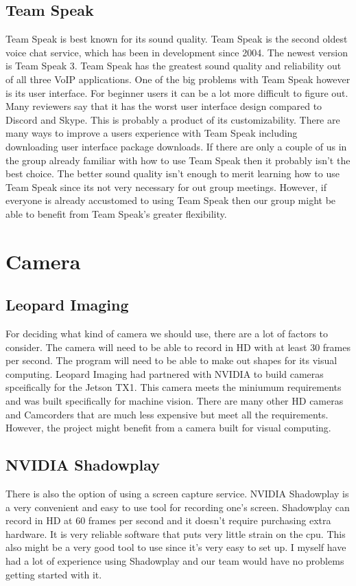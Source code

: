 \subsection{Team Speak}
Team Speak is best known for its sound quality.
Team Speak is the second oldest voice chat service, which has been in development since 2004.
The newest version is Team Speak 3.
Team Speak has the greatest sound quality and reliability out of all three VoIP applications.
One of the big problems with Team Speak however is its user interface.
For beginner users it can be a lot more difficult to figure out.
Many reviewers say that it has the worst user interface design compared to Discord and Skype.
This is probably a product of its customizability.
There are many ways to improve a users experience with Team Speak including downloading user interface package downloads.
If there are only a couple of us in the group already familiar with how to use Team Speak then it probably isn't the best choice.
The better sound quality isn't enough to merit learning how to use Team Speak since its not very necessary for out group meetings.
However, if everyone is already accustomed to using Team Speak then our group might be able to benefit from Team Speak's greater flexibility.

\section{Camera}
\subsection{Leopard Imaging}
For deciding what kind of camera we should use, there are a lot of factors to consider.
The camera will need to be able to record in HD with at least 30 frames per second.
The program will need to be able to make out shapes for its visual computing.
Leopard Imaging had partnered with NVIDIA to build cameras spceifically for the Jetson TX1.
This camera meets the miniumum requirements and was built specifically for machine vision.
There are many other HD cameras and Camcorders that are much less expensive but meet all the requirements.
However, the project might benefit from a camera built for visual computing.

\subsection{NVIDIA Shadowplay}
There is also the option of using a screen capture service.
NVIDIA Shadowplay is a very convenient and easy to use tool for recording one's screen.
Shadowplay can record in HD at 60 frames per second and it doesn't require purchasing extra hardware.
It is very reliable software that puts very little strain on the cpu.
This also might be a very good tool to use since it's very easy to set up.
I myself have had a lot of experience using Shadowplay and our team would have no problems getting started with it.

